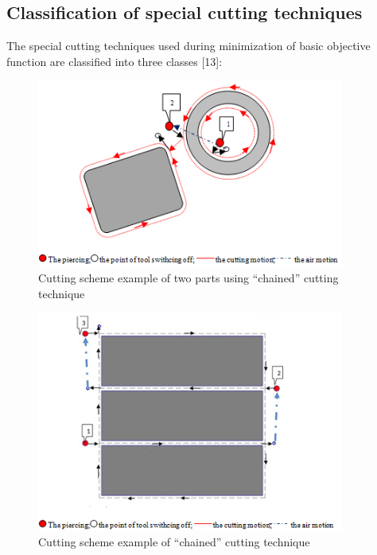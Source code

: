 \documentclass[runningheads]{llncs}
\begin{document}
\subsection{Classification of special cutting techniques}

The special cutting techniques used during minimization of basic objective function are classified into three classes [13]:

\begin{figure}
  \begin{center}
  \includegraphics[width=0.9\textwidth]{chain.png}
  \caption{Cutting scheme example of two parts using ``chained'' cutting technique}
  \label{chain}
  \end{center}
\end{figure}

\begin{figure}
  \begin{center}
  \includegraphics[width=0.9\textwidth]{common.png}
  \caption{Cutting scheme example of ``chained'' cutting technique}
  \label{common}
  \end{center}
\end{figure}
\end{document}
